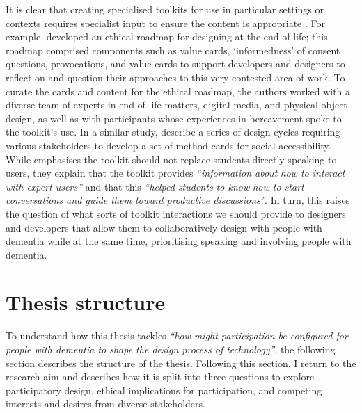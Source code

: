 It is clear that creating specialised toolkits for use in particular settings or contexts requires specialist input to ensure the content is appropriate \citep{alshehri2020scenario,meissner2018schnittmuster}. For example, \cite{craig2021development} developed an ethical roadmap for designing at the end-of-life; this roadmap comprised components such as value cards, ‘informedness’ of consent questions, provocations, and value cards to support developers and designers to reflect on and question their approaches to this very contested area of work. To curate the cards and content for the ethical roadmap, the authors worked with a diverse team of experts in end-of-life matters, digital media, and physical object design, as well as with participants whose experiences in bereavement spoke to the toolkit’s use. In a similar study, \cite{shinohara2020design} describe a series of design cycles requiring various stakeholders to develop a set of method cards for social accessibility. While \cite{shinohara2020design} emphasises the toolkit should not replace students directly speaking to users, they explain that the toolkit provides \textit{``information about how to interact with expert users''} and that this \textit{``helped students to know how to start conversations and guide them toward productive discussions'}'. In turn, this raises the question of what sorts of toolkit interactions we should provide to designers and developers that allow them to collaboratively design with people with dementia while at the same time, prioritising speaking and involving people with dementia.

\section{Thesis structure}
\label{Intro: Thesis structure}
To understand how this thesis tackles \textit{``how might participation be configured for people with dementia to shape the design process of technology''}, the following section describes the structure of the thesis. Following this section, I return to the research aim and describes how it is split into three questions to explore participatory design, ethical implications for participation, and competing interests and desires from diverse stakeholders. 


